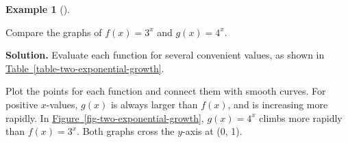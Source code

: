 \documentclass[10pt,]{book}
\theoremstyle{plain}
\theoremstyle{definition}
\theoremstyle{definition}
\theoremstyle{definition}
\newtheorem{example}[theorem]{Example}
\theoremstyle{definition}
\theoremstyle{definition}
\numberwithin{equation}{section}
\newcommand{\hrulethin}  {\noalign{\hrule height 0.04em}}
\newcommand{\hrulethick} {\noalign{\hrule height 0.11em}}
\newcounter{figstack}
\newcounter{figindex}
\newlength\fight
\newcommand\pushValignCaptionBottom[5][b]{%
\stepcounter{figstack}%
\expandafter\def\csname %
figalign\romannumeral\value{figstack}\endcsname{#1}%
\expandafter\def\csname %
figtype\romannumeral\value{figstack}\endcsname{#2}%
\expandafter\def\csname %
figwd\romannumeral\value{figstack}\endcsname{#3}%
\expandafter\def\csname %
figcontent\romannumeral\value{figstack}\endcsname{#4}%
\expandafter\def\csname %
figcap\romannumeral\value{figstack}\endcsname{#5}%
\setbox0=\hbox{%
\begin{#2}{#3}#4\end{#2}}%
\ifdim\dimexpr\ht0+\dp0\relax>\fight\global\setlength{\fight}{%
\dimexpr\ht0+\dp0\relax}\fi%
}
\newcommand\popValignCaptionBottom{%
\setcounter{figindex}{0}%
\hfill%
\whiledo{\value{figindex}<\value{figstack}}{%
\stepcounter{figindex}%
\def\tmp{\csname figwd\romannumeral\value{figindex}\endcsname}%
\begin{\csname figtype\romannumeral\value{figindex}\endcsname}[t]{\tmp}%
\centering%
\stackinset{c}{}%
{\csname figalign\romannumeral\value{figindex}\endcsname}{}%
{\csname figcontent\romannumeral\value{figindex}\endcsname}%
{\rule{0pt}{\fight}}\par%
\csname figcap\romannumeral\value{figindex}\endcsname%
\end{\csname figtype\romannumeral\value{figindex}\endcsname}%
\hfill%
}%
\setcounter{figstack}{0}%
\setlength{\fight}{0pt}%
\hfill%
}
\begin{document}
\begin{example}[]\label{example-two-exponential-growth}

	Compare the graphs of \(f (x) = 3^x\) and \(g(x) = 4^x\).
%
\par\medskip\noindent%
\textbf{Solution.}\quad 
	Evaluate each function for several convenient values, as shown in \hyperref[table-two-exponential-growth]{Table~\ref{table-two-exponential-growth}}.
%
\par

	Plot the points for each function and connect them with smooth curves. For positive \(x\)-values, \(g(x)\) is always larger than \(f (x)\), and is increasing more rapidly. In \hyperref[fig-two-exponential-growth]{Figure~\ref{fig-two-exponential-growth}}, \(g(x) = 4^x\) climbs more rapidly than \(f (x) = 3^x\). Both graphs cross the \(y\)-axis at (0, 1).
%
\leavevmode%
\end{example}
\end{document}
